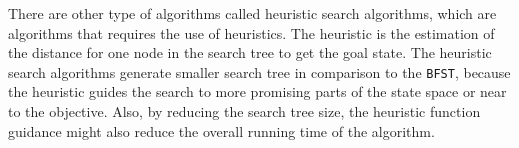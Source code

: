 \begin{landscape}

\end{landscape}

\fi

There are other type of algorithms called heuristic search algorithms, which are algorithms that requires the use of heuristics. The heuristic is the estimation of the distance for one node in the search tree to get the goal state. The heuristic search algorithms generate smaller search tree in comparison to the \texttt{BFST}, because the heuristic guides the search to more promising parts of the state space or near to the objective. Also, by reducing the search tree size, the heuristic function guidance might also reduce the overall running time of the algorithm.

